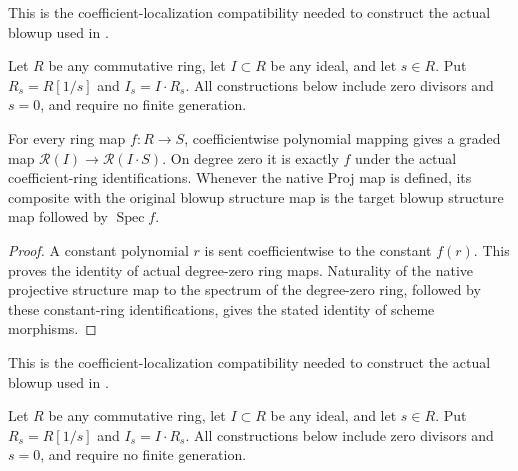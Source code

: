 \endgroup

\begingroup

This is the coefficient-localization compatibility needed to construct the
actual blowup used in \cite[4.8]{deJong}.

Let $R$ be any commutative ring, let $I\subset R$ be any ideal, and let
$s\in R$. Put $R_s=R[1/s]$ and $I_s=I\cdot R_s$. All constructions below
include zero divisors and $s=0$, and require no finite generation.

\begin{lemma}\label{lem:rees-localization-structure}
\leanok
For every ring map $f:R\to S$, coefficientwise polynomial mapping gives
a graded map $\mathcal R(I)\to\mathcal R(I\cdot S)$. On degree zero it
is exactly $f$ under the actual coefficient-ring identifications.
Whenever the native Proj map is defined, its composite with the original
blowup structure map is the target blowup structure map followed by
$\operatorname{Spec}f$.
\end{lemma}
\begin{proof}
A constant polynomial $r$ is sent coefficientwise to the constant $f(r)$.
This proves the identity of actual degree-zero ring maps. Naturality of
the native projective structure map to the spectrum of the degree-zero
ring, followed by these constant-ring identifications, gives the stated
identity of scheme morphisms.
\end{proof}

\endgroup

\begingroup

This is the coefficient-localization compatibility needed to construct the
actual blowup used in \cite[4.8]{deJong}.

Let $R$ be any commutative ring, let $I\subset R$ be any ideal, and let
$s\in R$. Put $R_s=R[1/s]$ and $I_s=I\cdot R_s$. All constructions below
include zero divisors and $s=0$, and require no finite generation.

